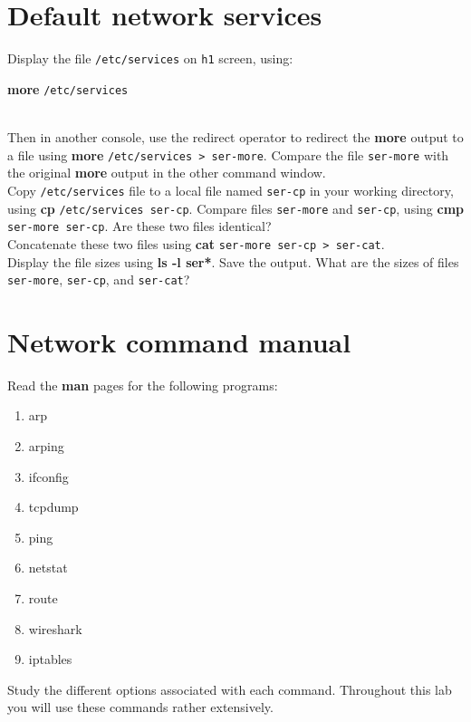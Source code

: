 \documentclass{../UTNetLab}
\begin{document}
\section{Default network services}
    Display the file \texttt{/etc/services} on \texttt{h1} screen, using: \\
    \centerline{\textbf{more} \texttt{/etc/services}} \\
    Then in another console, use the redirect operator to redirect the \textbf{more} output to
    a file using \textbf{more} \texttt{/etc/services > ser-more}. Compare the file \texttt{ser-more} with the original \textbf{more} output in the other command window. \\
    Copy \texttt{/etc/services} file to a local file named \texttt{ser-cp} in your working directory,
    using \textbf{cp} \texttt{/etc/services ser-cp}. Compare files \texttt{ser-more} and \texttt{ser-cp}, using \textbf{cmp} \texttt{ser-more ser-cp}. Are these two files identical?\\
    Concatenate these two files using \textbf{cat} \texttt{ser-more ser-cp > ser-cat}. \\
    Display the file sizes using \textbf{ls -l ser*}. Save the output. What are the sizes of files \texttt{ser-more}, \texttt{ser-cp}, and \texttt{ser-cat}?

\section{Network command manual}
    Read the \textbf{man} pages for the following programs:
    \begin{multicols}{3}
        \begin{enumerate}
            \item arp
            \item arping
            \item ifconfig
            \item tcpdump
            \item ping
            \item netstat
            \item route
            \item wireshark
            \item iptables
        \end{enumerate}
    \end{multicols}
    Study the different options associated with each command.
    Throughout this lab you will use these commands rather extensively.
\end{document}

